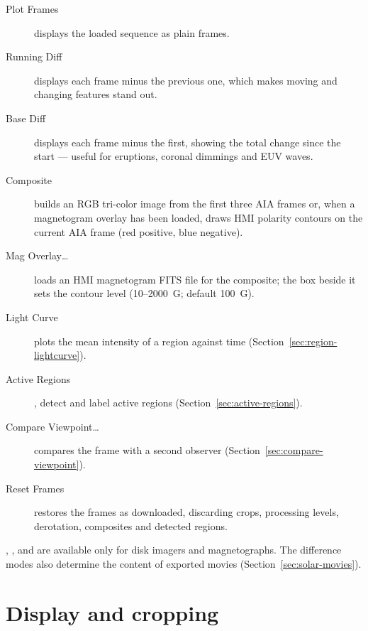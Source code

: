 \begin{description}
  \item[Plot Frames] displays the loaded sequence as plain frames.
  \item[Running Diff] displays each frame minus the previous one, which makes moving and
    changing features stand out.
  \item[Base Diff] displays each frame minus the first, showing the total change since the
    start --- useful for eruptions, coronal dimmings and EUV waves.
  \item[Composite] builds an RGB tri-color image from the first three AIA frames or, when a
    magnetogram overlay has been loaded, draws HMI polarity contours on the current AIA frame
    (red positive, blue negative).
  \item[Mag Overlay…] loads an HMI magnetogram FITS file for the composite; the box beside it
    sets the contour level (10--2000~G; default 100~G).
  \item[Light Curve] plots the mean intensity of a region against time
    (Section~\ref{sec:region-lightcurve}).
  \item[Active Regions],  detect and label active regions
    (Section~\ref{sec:active-regions}).
  \item[Compare Viewpoint…] compares the frame with a second observer
    (Section~\ref{sec:compare-viewpoint}).
  \item[Reset Frames] restores the frames as downloaded, discarding crops, processing
    levels, derotation, composites and detected regions.
\end{description}
, ,  and  are
available only for disk imagers and magnetographs. The difference modes also determine the
content of exported movies (Section~\ref{sec:solar-movies}).

\section{Display and cropping}
\label{sec:display-crop}

